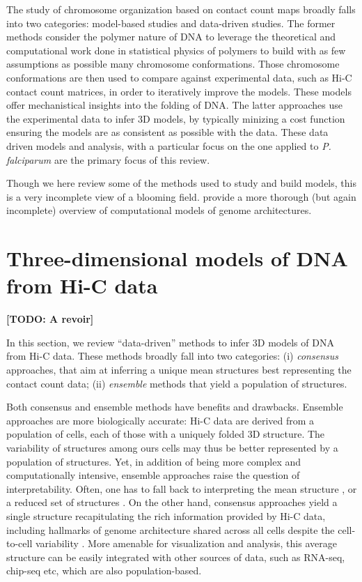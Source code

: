 \documentclass[letterpaper,12pt]{article}
\newcommand{\todo}[1]{\textbf{[TODO: #1]}}
\begin{document}
The study of chromosome organization based on contact count maps broadly
falls into two categories: model-based studies and data-driven studies. The
former methods consider the polymer nature of DNA to leverage the theoretical
and computational work done in statistical physics of polymers to build with
as few assumptions as possible many chromosome conformations. Those chromosome
conformations are then used to compare against experimental data, such as Hi-C
contact count matrices, in order to iteratively improve the models. These
models offer mechanistical insights into the folding of DNA. The latter
approaches use the experimental data to infer 3D models, by typically minizing
a cost function ensuring the models are as consistent as possible with the
data. These data driven models and analysis, with a particular focus on the
one applied to {\em P. falciparum} are the primary focus of this
review.


Though we here review some of the methods used to study and build models, this
is a very incomplete view of a blooming field. \citet{rosa:computational}
provide a more thorough (but again incomplete) overview of computational models
of genome architectures.


\section*{Three-dimensional models of DNA from Hi-C data}

\todo{A revoir}

In this section, we review ``data-driven'' methods to infer 3D models of DNA
from Hi-C data. These methods broadly fall into two categories: (i)
\textit{consensus} approaches, that aim at inferring a unique mean structures
best representing the contact count data; (ii) \textit{ensemble} methods that
yield a population of structures.

Both consensus and ensemble methods have benefits and drawbacks. Ensemble
approaches are more biologically accurate: Hi-C data are derived from a
population of cells, each of those with a uniquely folded 3D structure. The
variability of structures among ours cells may thus be better represented by a
population of structures. Yet, in addition of being more complex and
computationally intensive, ensemble approaches raise the question of
interpretability. Often, one has to fall back to interpreting the mean
structure \citep{kalhor:genome}, or a reduced set of structures
\citep{rousseau:three}. On the other hand, consensus approaches yield a single
structure recapitulating the rich information provided by Hi-C data, including
hallmarks of genome architecture shared across all cells despite the
cell-to-cell variability \citet{nagano:single-cell}. More amenable for
visualization and analysis, this average structure can be easily integrated
with other sources of data, such as RNA-seq, chip-seq etc, which are also
population-based.
\end{document}
